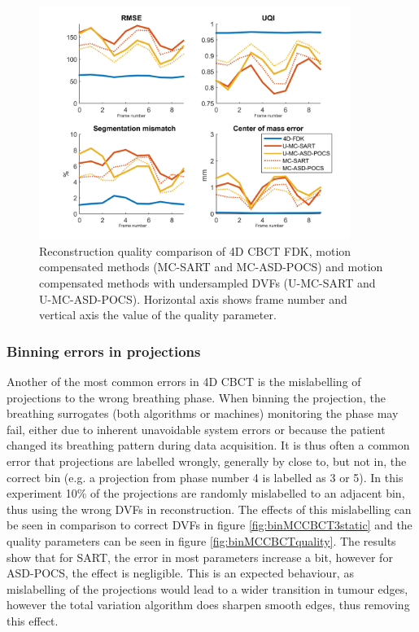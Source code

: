 \begin{figure}
\begin{center}

\includegraphics[width=0.9\textwidth]{accuracyMC/UMCCBCTparams.png} 


\end{center}

\caption[Reconstruction quality comparison of motion compensation]{\label{fig:UMCCBCTquality} Reconstruction quality comparison of 4D CBCT FDK, motion compensated methods (MC-SART and MC-ASD-POCS) and motion compensated methods with undersampled DVFs (U-MC-SART and U-MC-ASD-POCS). Horizontal axis shows frame number and vertical axis the value of the quality parameter.} 
\end{figure}
\subsubsection{Binning errors in projections}
Another of the most common errors in 4D CBCT is the mislabelling of projections to the wrong breathing phase. When binning the projection, the breathing surrogates (both algorithms or machines) monitoring the phase may fail, either due to inherent unavoidable system errors or because the patient changed its breathing pattern during data acquisition. It is thus often a common error that projections are labelled wrongly, generally by close to, but not in, the correct bin (e.g. a projection from phase number 4 is labelled as 3 or 5). In this experiment 10\% of the projections are randomly mislabelled to an adjacent bin, thus using the wrong DVFs in reconstruction. The effects of this mislabelling can be seen in comparison to correct DVFs in figure \ref{fig:binMCCBCT3static} and the quality parameters can be seen in figure \ref{fig:binMCCBCTquality}. The results show that for SART, the error in most parameters increase a bit, however for ASD-POCS, the effect is negligible. This is an expected behaviour, as mislabelling of the projections would lead to a wider transition in tumour edges, however the total variation algorithm does sharpen smooth edges, thus removing this effect.


